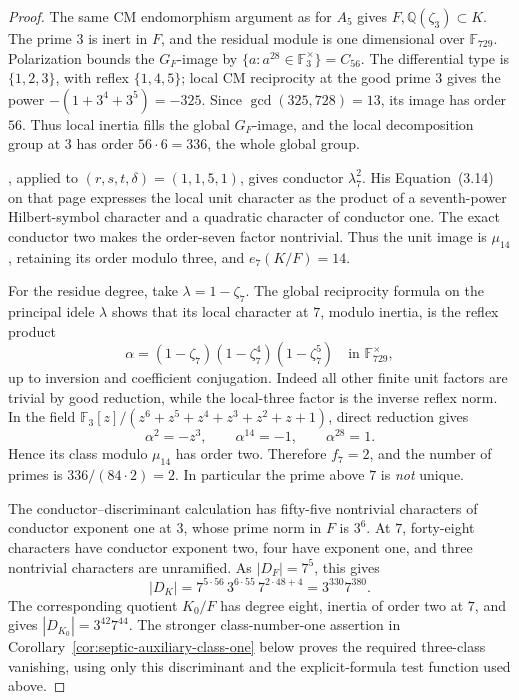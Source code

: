 \begin{proof}
The same CM endomorphism argument as for $A_5$ gives
$F,\mathbb Q(\zeta_3)\subset K$.
The prime $3$ is inert in $F$, and the residual module is
one dimensional over $\mathbb F_{729}$.
Polarization bounds the $G_F$-image by
$\{a:a^{28}\in\mathbb F_3^\times\}=C_{56}$.
The differential type is $\{1,2,3\}$, with reflex
$\{1,4,5\}$; local CM reciprocity at the good prime
$3$ gives the power $-(1+3^4+3^5)=-325$.
Since $\gcd(325,728)=13$, its image has order $56$.
Thus local inertia fills the global $G_F$-image, and
the local decomposition group at $3$ has order
$56\cdot6=336$, the whole global group.

\citet[Proposition~3.12(2), author p.~16]{ShuExpanded2021}, applied
to $(r,s,t,\delta)=(1,1,5,1)$, gives conductor $\lambda_7^2$.
His Equation~(3.14) on that page expresses the local
unit character as the product of a seventh-power
Hilbert-symbol character and a quadratic character of
conductor one.  The exact conductor two makes the
order-seven factor nontrivial.  Thus the unit image is
$\mu_{14}$, retaining its order modulo three, and
$e_7(K/F)=14$.

For the residue degree, take $\lambda=1-\zeta_7$.
The global reciprocity formula on the principal idele
$\lambda$ shows that its local character at $7$, modulo
inertia, is the reflex product
\[
 \alpha=(1-\zeta_7)(1-\zeta_7^4)(1-\zeta_7^5)
       \quad\text{in }\mathbb F_{729}^{\times},
\]
up to inversion and coefficient conjugation.
Indeed all other finite unit factors are trivial by
good reduction, while the local-three factor is the
inverse reflex norm.
In the field
$\mathbb F_3[z]/(z^6+z^5+z^4+z^3+z^2+z+1)$, direct
reduction gives
\[
 \alpha^2=-z^3,\qquad \alpha^{14}=-1,\qquad
 \alpha^{28}=1.
\]
Hence its class modulo $\mu_{14}$ has order two.
Therefore $f_7=2$, and the number of primes is
$336/(84\cdot2)=2$.
In particular the prime above $7$ is \emph{not} unique.

The conductor--discriminant calculation has fifty-five
nontrivial characters of conductor exponent one at
$3$, whose prime norm in $F$ is $3^6$.
At $7$, forty-eight characters have conductor exponent
two, four have exponent one, and three nontrivial
characters are unramified.  As $|D_F|=7^5$, this gives
\[
 |D_K|=7^{5\cdot56}\,3^{6\cdot55}\,7^{2\cdot48+4}
       =3^{330}7^{380}.
\]
The corresponding quotient $K_0/F$ has degree eight,
inertia of order two at $7$, and gives
$|D_{K_0}|=3^{42}7^{44}$.
The stronger class-number-one assertion in
Corollary~\ref{cor:septic-auxiliary-class-one} below proves
the required three-class vanishing, using only this
discriminant and the explicit-formula test function used above.


\end{proof}

